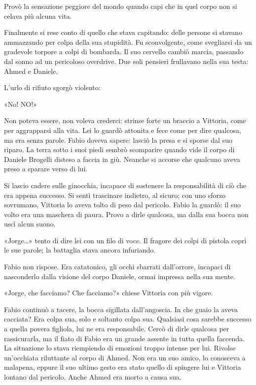 Provò la sensazione peggiore del mondo quando capi che in quel corpo non si celava più alcuna vita.

Finalmente si rese conto di quello che stava capitando: delle persone si stavano ammazzando per colpa della sua stupidità. Fu sconvolgente, come svegliarsi da un gradevole torpore a colpi di bombarda. Il suo cervello cambiò marcia, passando dal sonno ad un pericoloso overdrive. Due soli pensieri frullavano nella sua testa: Ahmed e Daniele.

L'urlo di rifiuto sgorgò violento:

«No! NO!»

Non poteva essere, non voleva crederci: strinse forte un braccio a Vittoria, come per aggrapparsi alla vita. Lei lo guardò attonita e fece come per dire qualcosa, ma era senza parole. Fabio doveva sapere: lasciò la presa e si sporse dal suo riparo. La terra sotto i suoi piedi sembrò scomparire quando vide il corpo di Daniele Brogelli disteso a faccia in giù. Neanche si accorse che qualcuno aveva preso a sparare verso di lui.

Si lascio cadere sulle ginocchia, incapace di sostenere la responsabilità di ciò che era appena successo. Si sentì trascinare indietro, al sicuro; con uno sforzo sovrumano, Vittoria lo aveva tolto di peso dal pericolo. Fabio la guardò: il suo volto era una maschera di paura. Provo a dirle qualcosa, ma dalla sua bocca non uscì alcun suono.

«Jorge\ldots» tento di dire lei con un filo di voce. Il fragore dei colpi di pistola coprì le sue parole; la battaglia stava ancora infuriando.

Fabio non rispose. Era catatonico, gli occhi sbarrati dall'orrore, incapaci di nasconderlo dalla visione del corpo Daniele, ormai impressa nella sua mente.

«Jorge, che facciamo? Che facciamo?» chiese Vittoria con più vigore.

Fabio continuò a tacere, la bocca sigillata dall'angoscia. In che guaio la aveva cacciata? Era colpa sua, solo e soltanto colpa sua. Qualsiasi cosa sarebbe successo a quella povera figliola, lui ne era responsabile. Cercò di dirle qualcosa per rassicurarla, ma il fiato di Fabio era un grande assente in tutta quella faccenda. La situazione lo stava riempiendo di emozioni troppo intense per lui. Rivolse un'occhiata riluttante al corpo di Ahmed. Non era un suo amico, lo conosceva a malapena, eppure il suo ultimo gesto era stato quello di spingere lui e Vittoria lontano dal pericolo. Anche Ahmed era morto a causa sua.

